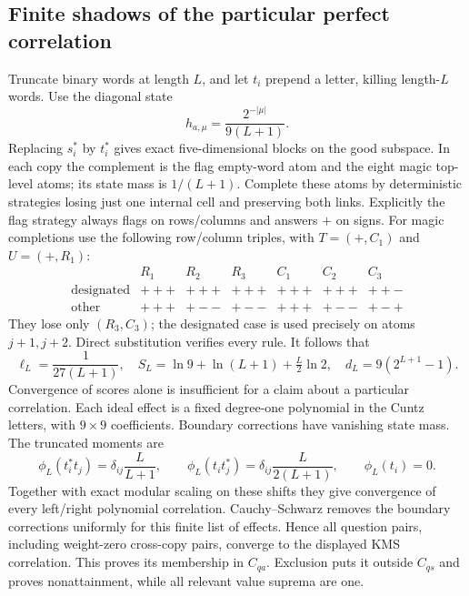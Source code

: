 \subsection{Finite shadows of the particular perfect correlation}
Truncate binary words at length $L$, and let $t_i$ prepend a letter, killing length-$L$ words. Use the diagonal state
\[
 h_{a,\mu}=\frac{2^{-|\mu|}}{9(L+1)}.
\]
Replacing $s_i^*$ by $t_i^*$ gives exact five-dimensional blocks on the good subspace. In each copy the complement is the flag empty-word atom and the eight magic top-level atoms; its state mass is $1/(L+1)$. Complete these atoms by deterministic strategies losing just one internal cell and preserving both links. Explicitly the flag strategy always flags on rows/columns and answers $+$ on signs. For magic completions use the following row/column triples, with $T=(+,C_1)$ and $U=(+,R_1)$:
\[
\begin{array}{c|ccc|ccc}
 &R_1&R_2&R_3&C_1&C_2&C_3\\\hline
\text{designated}&+++&+++&+++&+++&+++&++-\\
\text{other}&+++&+--&+--&+++&+--&+-+
\end{array}
\]
They lose only $(R_3,C_3)$; the designated case is used precisely on atoms $j+1,j+2$. Direct substitution verifies every rule. It follows that
\[
 \ell_L=\frac1{27(L+1)},\quad
 S_L=\ln9+\ln(L+1)+\tfrac L2\ln2,\quad
 d_L=9(2^{L+1}-1).
\]
Convergence of scores alone is insufficient for a claim about a particular correlation. Each ideal effect is a fixed degree-one polynomial in the Cuntz letters, with $9\times9$ coefficients. Boundary corrections have vanishing state mass. The truncated moments are
\[
 \phi_L(t_i^*t_j)=\delta_{ij}\frac L{L+1},\qquad
 \phi_L(t_it_j^*)=\delta_{ij}\frac L{2(L+1)},\qquad\phi_L(t_i)=0.
\]
Together with exact modular scaling on these shifts they give convergence of every left/right polynomial correlation. Cauchy--Schwarz removes the boundary corrections uniformly for this finite list of effects. Hence all question pairs, including weight-zero cross-copy pairs, converge to the displayed KMS correlation. This proves its membership in $C_{qa}$. Exclusion puts it outside $C_{qs}$ and proves nonattainment, while all relevant value suprema are one.
